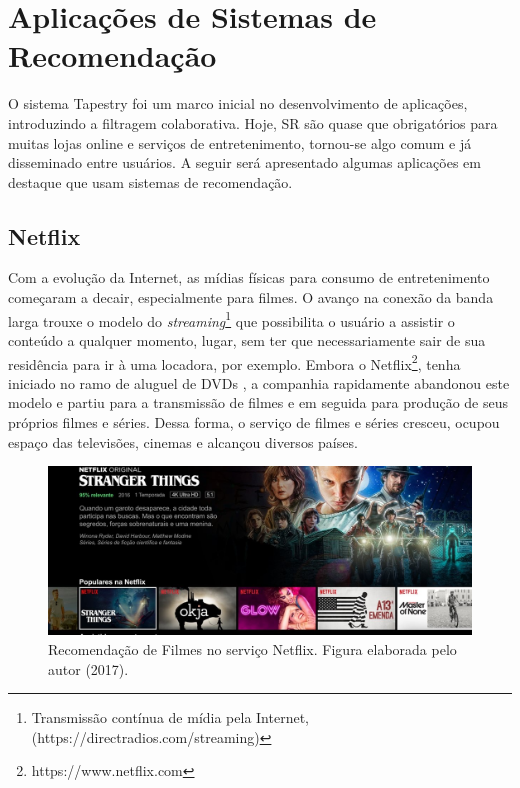 \section{Aplicações de Sistemas de Recomendação}

O sistema Tapestry \citep{Goldberg:1992:UCF:138859.138867} foi um marco inicial no desenvolvimento de aplicações, introduzindo a filtragem colaborativa. Hoje, SR são quase que obrigatórios para muitas lojas online e serviços de entretenimento, tornou-se algo comum e já disseminado entre usuários. A seguir será apresentado algumas aplicações em destaque que usam sistemas de recomendação.

\subsection{Netflix}

Com a evolução da Internet, as mídias físicas para consumo de entretenimento começaram a decair, especialmente para filmes. O avanço na conexão da banda larga trouxe o modelo do \textit{streaming}\footnote{Transmissão contínua de mídia pela Internet, (https://directradios.com/streaming)} que possibilita o usuário a assistir o conteúdo a qualquer momento, lugar, sem ter que  necessariamente sair de sua residência para ir à uma locadora, por exemplo. Embora o Netflix\footnote{https://www.netflix.com}, tenha iniciado no ramo de aluguel de DVDs \citep{keating2012netflixed}, a companhia rapidamente abandonou este modelo e partiu para a transmissão de filmes e em seguida para produção de seus próprios filmes e séries. Dessa forma, o serviço de filmes e séries cresceu, ocupou espaço das televisões, cinemas e alcançou diversos países.

\begin{figure}
	\centering
	\includegraphics[scale=0.40]{imagens/netflix_recsys.jpg}
	\caption{Recomendação de Filmes no serviço Netflix. Figura elaborada pelo autor (2017).}
	\label{fig:netflix}
\end{figure}

